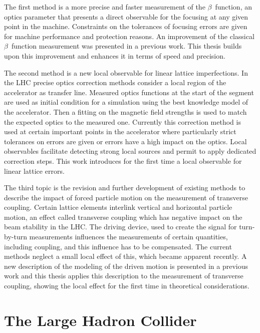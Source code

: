 The first method is a more precise and faster 
measurement of the $\beta$~function, an optics parameter that presents a direct observable for the
focusing at any given point in the machine. Constraints on the tolerances of focusing errors are given
for machine performance and protection reasons. An improvement of the classical $\beta$~function measurement
was presented in a previous work. This thesis builds upon this improvement and enhances it in terms of speed
and precision.

The second method is a new local observable for linear lattice imperfections.
In the LHC precise optics correction
methods consider a local region of the accelerator as transfer line. Measured optics functions at the start
of the segment are used as initial condition for a simulation using the best knowledge model of the accelerator.
Then a fitting on the magnetic field strengths is used to match the expected optics to the measured one.
Currently this correction method is used at certain important points in the accelerator where particularly
strict tolerances on errors are given or errors have a high impact on the optics.
Local observables facilitate detecting strong local sources and permit to apply dedicated correction steps.
This work introduces for the first time a local observable for linear lattice errors.

The third topic is the revision and further development of existing methods
to describe the impact of forced particle motion on the measurement of transverse coupling.
Certain lattice elements interlink vertical and horizontal particle motion, an effect called
transverse coupling which has negative impact on the beam stability in the LHC.
The driving device, used to create the signal for turn-by-turn measurements influences
the measurements of certain quantities, including coupling, and this influence has to be compensated.
The current methods neglect a small local effect of this, which became apparent recently.
A new description of the modeling of the driven motion is presented in a previous work and this
thesis applies this description to the measurement of transverse coupling, showing the local
effect for the first time in theoretical considerations.



\section{The Large Hadron Collider}

